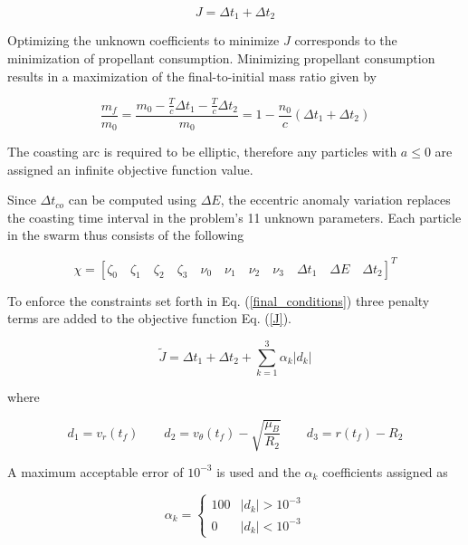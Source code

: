\begin{equation}
J = \Delta t_1 + \Delta t_2
\label{J}
\end{equation}

\noindent Optimizing the unknown coefficients to minimize $J$ corresponds to the minimization of propellant consumption. Minimizing propellant consumption
results in a maximization of the final-to-initial mass ratio given by 

\begin{equation}
\dfrac{m_f}{m_0} = \dfrac{m_0-\frac{T}{c}\Delta t_1-\frac{T}{c}\Delta t_2}{m_0} = 1-\dfrac{n_0}{c}(\Delta t_1 +\Delta t_2)
\label{finalToInitialMassRatio}
\end{equation}

\noindent The coasting arc is required to be elliptic, therefore any particles with $a \leq 0$ are assigned an infinite objective function value. \newline

\noindent Since $\Delta t_{co}$ can be computed using $\Delta E$, the eccentric anomaly variation replaces the coasting time interval in the 
problem's 11 unknown parameters. Each particle in the swarm thus consists of the following

\begin{equation}
\chi = [ \zeta_0 \quad \zeta_1 \quad \zeta_2 \quad \zeta_3 \quad \nu_0 \quad \nu_1 \quad \nu_2 \quad \nu_3 \quad \Delta t_1 \quad \Delta E \quad \Delta t_2 ]^T
\label{particleUnkowns}
\end{equation}

\noindent To enforce the constraints set forth in Eq. (\ref{final_conditions}) three penalty terms are added to the objective function Eq. (\ref{J}).

\begin{equation}
\tilde{J} = \Delta t_1 + \Delta t_2 + \sum_{k=1}^3 \alpha_k|d_k| 
\label{JwithPenalty}
\end{equation}

\noindent where 

\begin{equation}
d_1 = v_r(t_f) \quad \quad d_2 = v_\theta(t_f) - \sqrt{\dfrac{\mu_B}{R_2}} \quad \quad 
d_3 = r(t_f)-R_2
\label{penaltyValues}
\end{equation}

\noindent A maximum acceptable error of $10^{-3}$ is used and the $\alpha_k$ coefficients assigned as  

\begin{equation}
    \label{penaltyCoefficients}
\alpha_k = \begin{cases}
    100 & |d_k| > 10^{-3} \\
    0 & |d_k| < 10^{-3}
\end{cases}
\end{equation}


